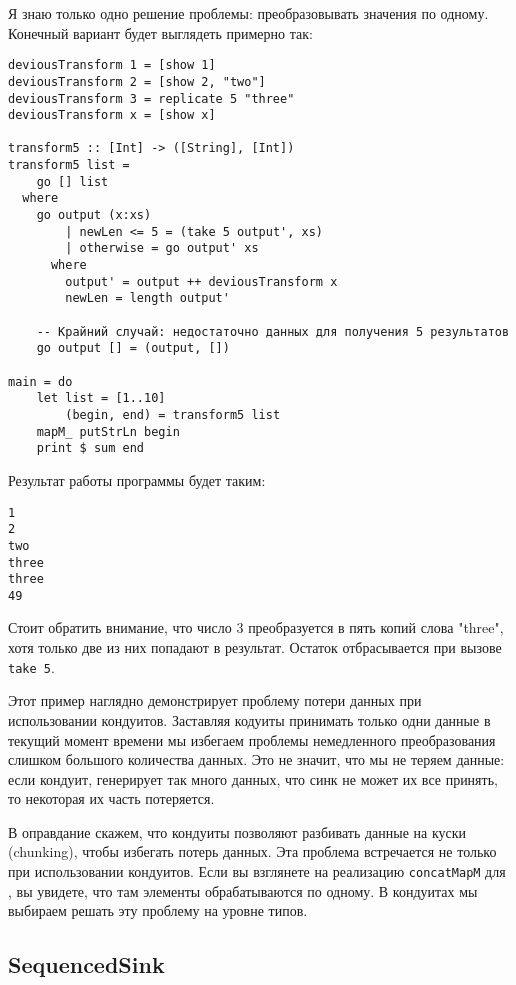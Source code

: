 {Я знаю только одно решение проблемы: преобразовывать значения по одному. 
Конечный вариант будет выглядеть примерно так:
\begin{lstlisting}
deviousTransform 1 = [show 1]
deviousTransform 2 = [show 2, "two"]
deviousTransform 3 = replicate 5 "three"
deviousTransform x = [show x]

transform5 :: [Int] -> ([String], [Int])
transform5 list =
    go [] list
  where
    go output (x:xs)
        | newLen <= 5 = (take 5 output', xs)
        | otherwise = go output' xs
      where
        output' = output ++ deviousTransform x
        newLen = length output'

    -- Крайний случай: недостаточно данных для получения 5 результатов
    go output [] = (output, [])

main = do
    let list = [1..10]
        (begin, end) = transform5 list
    mapM_ putStrLn begin
    print $ sum end
\end{lstlisting}    
Результат работы программы будет таким:
\begin{verbatim}
1
2
two
three
three
49
\end{verbatim}
Стоит обратить внимание, что число 3 преобразуется в пять копий слова "three", 
хотя только две из них попадают в результат. Остаток отбрасывается при 
вызове \verb=take 5=.
 
Этот пример наглядно демонстрирует проблему потери данных при использовании 
кондуитов. Заставляя кодуиты принимать только одни данные в текущий момент 
времени мы избегаем проблемы немедленного преобразования слишком большого 
количества данных. Это не значит, что мы не теряем данные: если кондуит, 
генерирует так много данных, что синк не может их все принять, то некоторая их 
часть потеряется.
 
В оправдание скажем, что кондуиты позволяют разбивать данные на куски (chunking), 
чтобы избегать потерь данных.
Эта проблема встречается не только при использовании кондуитов. Если вы 
взглянете на реализацию \lstinline'concatMapM' для 
, вы увидете, что 
там элементы обрабатываются по одному. В кондуитах мы выбираем решать эту 
проблему на уровне типов.
 
\subsection{SequencedSink}
 
}
